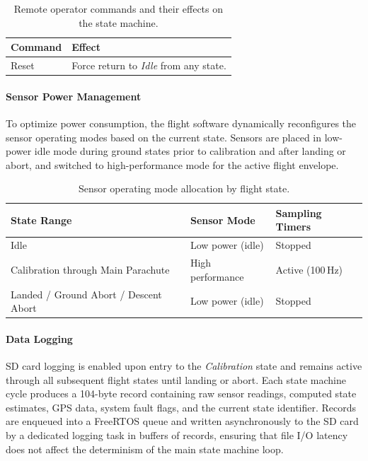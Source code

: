 \begin{table}[H]
\centering
\caption{Remote operator commands and their effects on the state machine.}
\label{tab:remote_commands}
\begin{tabularx}{\textwidth}{l X}
\toprule
\textbf{Command} & \textbf{Effect} \\
\midrule
Reset & Force return to \emph{Idle} from any state. \\
\bottomrule
\end{tabularx}
\end{table}

\paragraph{Sensor Power Management}

To optimize power consumption, the flight software dynamically reconfigures the sensor operating modes based on the current state. Sensors are placed in low-power idle mode during ground states prior to calibration and after landing or abort, and switched to high-performance mode for the active flight envelope.

\begin{table}[H]
\centering
\caption{Sensor operating mode allocation by flight state.}
\label{tab:sensor_modes}
\begin{tabularx}{\textwidth}{l l X}
\toprule
\textbf{State Range} & \textbf{Sensor Mode} & \textbf{Sampling Timers} \\
\midrule
Idle & Low power (idle) & Stopped \\
Calibration through Main Parachute & High performance & Active (100\,Hz) \\
Landed / Ground Abort / Descent Abort & Low power (idle) & Stopped \\
\bottomrule
\end{tabularx}
\end{table}

\paragraph{Data Logging}

SD card logging is enabled upon entry to the \emph{Calibration} state and remains active through all subsequent flight states until landing or abort. Each state machine cycle produces a 104-byte record containing raw sensor readings, computed state estimates, GPS data, system fault flags, and the current state identifier. Records are enqueued into a FreeRTOS queue and written asynchronously to the SD card by a dedicated logging task in buffers of  records, ensuring that file I/O latency does not affect the determinism of the main state machine loop.
